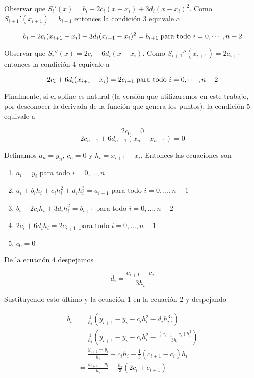 Observar que $S_i'(x) = b_i + 2c_i(x - x_i) + 3 d_i (x - x_i)^2$. Como $S_{i + 1}'(x_{i + 1}) = b_{i + 1}$ entonces la condición 3 equivale a 

\[b_i + 2c_i(x_{i + 1} - x_i) + 3 d_i (x_{i + 1} - x_i)^2 = b_{i + 1} \hspace{0.1cm}\text{para todo } i = 0, \cdots, n - 2\]

Observar que $S_i''(x) = 2c_i + 6d_i(x - x_i)$. Como $S_{i + 1}''(x_{i + 1}) = 2c_{i + 1}$ entonces la condición 4 equivale a

\[2c_i + 6d_i(x_{i + 1} - x_i) = 2c_{i + 1} \hspace{0.1cm}\text{para todo } i = 0, \cdots, n - 2\]

Finalmente, si el spline es natural (la versión que utilizaremos en este trabajo, por desconocer la derivada de la función que genera los puntos), la condición 5 equivale a

\[2c_0 = 0\]
\[2c_{n - 1} + 6d_{n - 1}(x_n - x_{n - 1}) = 0\]

Definamos $a_n = y_n$, $c_n = 0$ y $h_i = x_{i + 1} - x_i$. Entonces las ecuaciones son

\begin{enumerate}
\item $a_i = y_i$ para todo $i = 0, \ldots, n$
\item $a_i + b_ih_{i} + c_i h_{i}^2 + d_i h_{i}^3 = a_{i + 1}$ para todo $i = 0, \ldots, n - 1$
\item $b_i + 2c_i h_{i} + 3d_i h_{i} ^2 = b_{i + 1}$ para todo $i = 0, \ldots, n - 2$
\item $2c_i + 6d_i h_{i} = 2c_{i + 1}$ para todo $i = 0, \ldots, n - 1$
\item $c_0 = 0$
\end{enumerate} 

De la ecuación 4 despejamos

\[d_i = \frac{c_{i + 1} - c_i}{3 h_{i}}\]

Sustituyendo esto último y la ecuación 1 en la ecuación 2 y despejando

\begin{align*}
b_i &= \frac{1}{h_{i}}\left(y_{i + 1} - y_i - c_i h_{i}^2 - d_i h_{i}^3)\right)\\
    &= \frac{1}{h_{i}}\left(y_{i + 1} - y_i - c_i h_{i}^2 - \frac{(c_{i + 1} - c_i) h_{i}^3}{3 h_{i}}\right)\\
    &= \frac{y_{i + 1} - y_i}{h_{i}} - c_i h_{i} - \frac{1}{3} (c_{i + 1} - c_i) h_{i}\\
    &= \frac{y_{i + 1} - y_i}{h_{i}} - \frac{h_{i}}{3}\left(2c_i + c_{i + 1}\right)
\end{align*}

